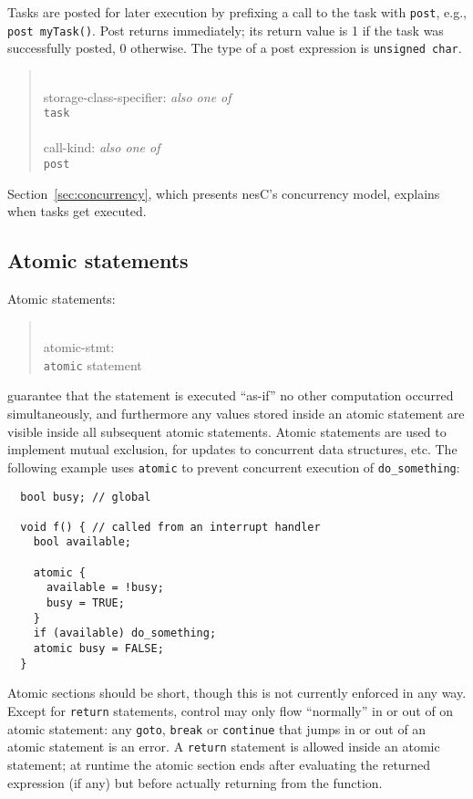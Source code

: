 \documentclass[11pt,letterpaper]{article}
\newcommand{\kw}[1]{{\tt #1}}
\newcommand{\code}[1]{{\tt #1}}
\newcommand{\nesc}{nesC\xspace}
\newcommand{\grammarshift}{\vspace*{-.7cm}}
\newcommand{\grammarindent}{\hspace*{2cm}\= \\ \kill}
\begin{document}
Tasks are posted for later execution by prefixing a call to the task
with \kw{post}, e.g., \code{post myTask()}. Post returns immediately;
its return value is 1 if the task was successfully posted, 0
otherwise. The type of a post expression is \code{unsigned char}.
\begin{quote} \grammarshift \em \begin{tabbing}
\grammarindent
storage-class-specifier: \emph{also one of}\\
\>	\kw{task}\\
\\
call-kind: \emph{also one of}\\
\>	\kw{post}
\end{tabbing} \end{quote}
Section~\ref{sec:concurrency}, which presents \nesc's concurrency
model, explains when tasks get executed.

\subsection{Atomic statements}

Atomic statements:
\begin{quote} \grammarshift \em \begin{tabbing}
\grammarindent
atomic-stmt: \\
\>	\kw{atomic} statement\\
\end{tabbing} \end{quote}
guarantee that the statement is executed ``as-if'' no other
computation occurred simultaneously, and furthermore any values stored
inside an atomic statement are visible inside all subsequent atomic
statements.  Atomic statements are used to implement mutual exclusion, for
updates to concurrent data structures, etc. The following example
uses \kw{atomic} to prevent concurrent execution of \code{do\_something}:
\begin{verbatim}
  bool busy; // global

  void f() { // called from an interrupt handler
    bool available;

    atomic {
      available = !busy;
      busy = TRUE;
    }
    if (available) do_something;
    atomic busy = FALSE;
  }
\end{verbatim}

Atomic sections should be short, though this is not currently enforced in
any way. Except for \kw{return} statements, control may only flow
``normally'' in or out of on atomic statement: any \kw{goto}, \kw{break} or
\kw{continue} that jumps in or out of an atomic statement is an error. A
\kw{return} statement is allowed inside an atomic statement; at runtime
the atomic section ends after evaluating the returned expression (if any)
but before actually returning from the function.
\end{document}
